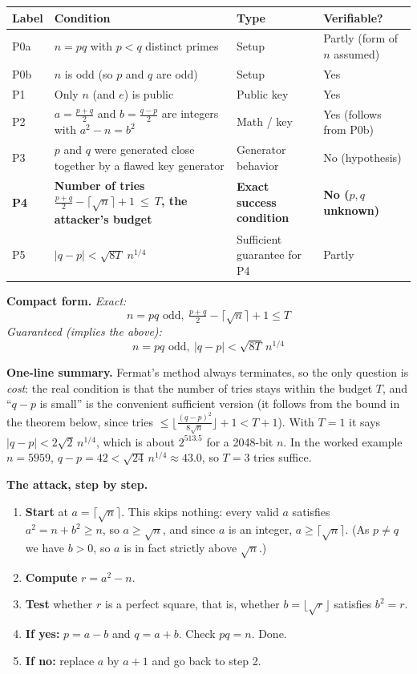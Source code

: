 \documentclass[11pt]{article}
\theoremstyle{definition}
\theoremstyle{remark}
\newcommand{\minorhead}[1]{\par\medskip\noindent{\large\bfseries\itshape #1}\par\nopagebreak\smallskip}
\begin{document}
\minorhead{Setup}
\begin{center}
\begin{tabular}{@{}>{\raggedright\arraybackslash}p{1.1cm}>{\raggedright\arraybackslash}p{7.9cm}>{\raggedright\arraybackslash}p{3.4cm}>{\raggedright\arraybackslash}p{2.6cm}@{}}
\toprule
\textbf{Label} & \textbf{Condition} & \textbf{Type} & \textbf{Verifiable?} \\
\midrule
P0a & $n=pq$ with $p<q$ distinct primes & Setup & Partly (form of $n$ assumed) \\
P0b & $n$ is odd (so $p$ and $q$ are odd) & Setup & Yes \\
P1 & Only $n$ (and $e$) is public & Public key & Yes \\
P2 & $a=\tfrac{p+q}{2}$ and $b=\tfrac{q-p}{2}$ are integers with $a^2-n=b^2$ & Math / key & Yes (follows from P0b) \\
P3 & $p$ and $q$ were generated close together by a flawed key generator & Generator behavior & No (hypothesis) \\
\textbf{P4} & \textbf{Number of tries $\tfrac{p+q}{2}-\lceil\sqrt n\rceil+1\ \le\ T$, the attacker's budget} & \textbf{Exact success condition} & \textbf{No ($p,q$ unknown)} \\
P5 & $|q-p|<\sqrt{8T}\;n^{1/4}$ & Sufficient guarantee for P4 & Partly \\
\bottomrule
\end{tabular}
\end{center}

\textbf{Compact form.}
\emph{Exact:}
\[
\boxed{\;n=pq\text{ odd},\ \tfrac{p+q}{2}-\lceil\sqrt n\rceil+1\le T\;}
\]
\emph{Guaranteed (implies the above):}
\[
\boxed{\;n=pq\text{ odd},\ |q-p|<\sqrt{8T}\,n^{1/4}\;}
\]

\textbf{One-line summary.} Fermat's method always terminates, so the only question is \emph{cost}: the real condition is that the number of tries stays within the budget $T$, and ``$q-p$ is small'' is the convenient sufficient version (it follows from the bound in the theorem below, since tries $\le\lfloor\tfrac{(q-p)^2}{8\sqrt n}\rfloor+1<T+1$). With $T=1$ it says $|q-p|<2\sqrt2\,n^{1/4}$, which is about $2^{513.5}$ for a 2048-bit $n$. In the worked example $n=5959$, $q-p=42<\sqrt{24}\,n^{1/4}\approx43.0$, so $T=3$ tries suffice.

\textbf{The attack, step by step.}
\begin{enumerate}[nosep]
\item \textbf{Start} at $a=\lceil\sqrt n\rceil$. This skips nothing: every valid $a$ satisfies $a^2=n+b^2\ge n$, so $a\ge\sqrt n$, and since $a$ is an integer, $a\ge\lceil\sqrt n\rceil$. (As $p\ne q$ we have $b>0$, so $a$ is in fact strictly above $\sqrt n$.)
\item \textbf{Compute} $r=a^2-n$.
\item \textbf{Test} whether $r$ is a perfect square, that is, whether $b=\lfloor\sqrt r\rfloor$ satisfies $b^2=r$.
\item \textbf{If yes:} $p=a-b$ and $q=a+b$. Check $pq=n$. Done.
\item \textbf{If no:} replace $a$ by $a+1$ and go back to step 2.
\end{enumerate}
\end{document}
